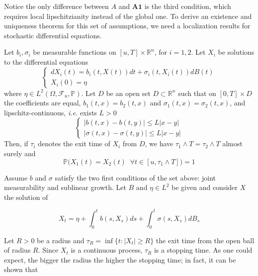 Notice the only difference between $\textit{A}$ and $\textbf{A1}$ is the third condition, which requires local lipschitzianity instead of the global one. To derive an existence and uniqueness theorem for this set of assumptions, we need a localization results for stochastic differential equations. 

\begin{theorem}
    Let $b_i,\sigma_i$ be measurable functions on $[u,T] \times \mathbb{R}^n$, for $i=1,2$. Let $X_i$ be solutions to the differential equations
    \begin{equation*}
    \begin{cases}
        dX_i(t) = b_i(t,X(t)) dt + \sigma_i(t,X_i(t)) dB(t) \\
        X_i(0) = \eta
    \end{cases}
    \end{equation*}
    where $\eta \in L^2(\Omega,\mathcal{F}_u,\mathbb{P})$. Let $D$ be an open set $D \subset \mathbb{R}^n$ such that on $[0,T] \times D$ the coefficients are equal, $b_1(t,x) = b_2(t,x)$ and $\sigma_1(t,x) = \sigma_2(t,x)$, and lipschitz-continuous, \textit{i.e.} exists $L > 0$ 
    \begin{equation*}
        \begin{cases}
            \vert b(t,x) - b(t,y) \vert \leq L\vert x-y \vert \\
            \vert \sigma(t,x)-\sigma(t,y) \vert \leq L\vert x - y \vert
        \end{cases}
    \end{equation*}
    Then, if $\tau_i$ denotes the exit time of $X_i$ from $D$, we have $\tau_1 \wedge T = \tau_2 \wedge T$ almost surely and 
    \begin{equation*}
        \mathbb{P}\big(X_1(t) = X_2(t) \;\; \forall t \in [u,\tau_1 \wedge T] \big) = 1
    \end{equation*}
\end{theorem}

Assume $b$ and $\sigma$ satisfy the two first conditions of the set above: joint measurability and sublinear growth. Let $B$ and $\eta \in L^2$ be given and consider $X$ the solution of 

\begin{equation*}
    X_t = \eta + \int_0^t b(s,X_s) ds + \int_0^t \sigma(s,X_s) dB_s
\end{equation*}

Let $R > 0$ be a radius and $\tau_R = \inf\{ t : \vert X_t \vert \geq R \}$ the exit time from the open ball of radius $R$. Since $X_t$ is a continuous process, $\tau_R$ is a stopping time. As one could expect, the bigger the radius the higher the stopping time; in fact, it can be shown that

